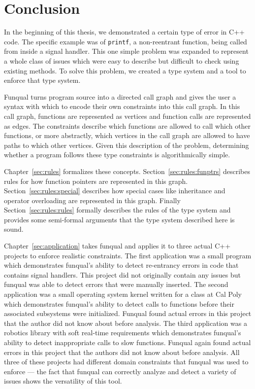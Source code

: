 \chapter{Conclusion}\label{sec:conclusion}

In the beginning of this thesis, we demonstrated a certain type of error in C++ code.  The specific example was of \lstinline{printf}, a non-reentrant function, being called from inside a signal handler.  This one simple problem was expanded to represent a whole class of issues which were easy to describe but difficult to check using existing methods.  To solve this problem, we created a type system and a tool to enforce that type system. 

Funqual turns program source into a directed call graph and gives the user a syntax with which to encode their own constraints into this call graph.  In this call graph, functions are represented as vertices and function calls are represented as edges.  The constraints describe which functions are allowed to call which other functions, or more abstractly, which vertices in the call graph are allowed to have paths to which other vertices.  Given this description of the problem, determining whether a program follows these type constraints is algorithmically simple.  

Chapter~\ref{sec:rules} formalizes these concepts.  Section~\ref{sec:rules:funptrs} describes rules for how function pointers are represented in this graph.  Section~\ref{sec:rules:special} describes how special cases like inheritance and operator overloading are represented in this graph.  Finally Section~\ref{sec:rules:rules} formally describes the rules of the type system and provides some semi-formal arguments that the type system described here is sound.  

Chapter~\ref{sec:application} takes funqual and applies it to three actual C++ projects to enforce realistic constraints.  The first application was a small program which demonstrates funqual's ability to detect re-entrancy errors in code that contains signal handlers.  This project did not originally contain any issues but funqual was able to detect errors that were manually inserted.  The second application was a small operating system kernel written for a class at Cal Poly which demonstrates funqual's ability to detect calls to functions before their associated subsystems were initialized.  Funqual found actual errors in this project that the author did not know about before analysis.  The third application was a robotics library with soft real-time requirements which demonstrates funqual's ability to detect inappropriate calls to slow functions.  Funqual again found actual errors in this project that the authors did not know about before analysis.  All three of these projects had different domain constraints that funqual was used to enforce --- the fact that funqual can correctly analyze and detect a variety of issues shows the versatility of this tool.  

